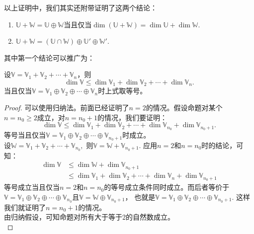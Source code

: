 \documentclass[12pt,UTF8,fontset=none]{ctexbook}
\begin{document}
以上证明中，我们其实还附带证明了这两个结论：
\begin{enumerate}
    \item $\mathbb{U} + \mathbb{W} = \mathbb{U} \oplus \mathbb{W}$当且仅当$\dim (\mathbb{U} + \mathbb{W}) = \dim \mathbb{U} + \dim \mathbb{W}.$
    \item $\mathbb{U} + \mathbb{W} = \left(\mathbb{U} \cap \mathbb{W}\right) \oplus \mathbb{U}' \oplus \mathbb{W}'.$
\end{enumerate}

其中第一个结论可以推广为：
\begin{pp}\label{pp:2_14}
    设$\mathbb{V} = \mathbb{V}_1 + \mathbb{V}_2 + \cdots + \mathbb{V}_n$，则
    $$ \dim \mathbb{V} \leq \dim \mathbb{V}_1 + \dim \mathbb{V}_2 + \cdots + \dim \mathbb{V}_n.$$
    当且仅当$\mathbb{V} = \mathbb{V}_1 \oplus \mathbb{V}_2 \oplus \cdots \oplus \mathbb{V}_n$时上式取等号。\\
\end{pp}

\begin{proof} %
    可以使用归纳法。前面已经证明了$n=2$的情况。假设命题对某个$n = n_0 \geq 2$成立，对$n = n_0+1$的情况，我们要证明：
    $$ \dim \mathbb{V} \leq \dim \mathbb{V}_1 + \dim \mathbb{V}_2 + \cdots + \dim \mathbb{V}_{n_0} + \dim \mathbb{V}_{n_0+1}.$$
    等号当且仅当$\mathbb{V} = \mathbb{V}_1 \oplus \mathbb{V}_2 \oplus \cdots \oplus \mathbb{V}_{n_0+1}$时成立。\\
    设$\mathbb{W} = \mathbb{V}_1 + \mathbb{V}_2 + \cdots + \mathbb{V}_{n_0},$ 则$\mathbb{V} = \mathbb{W} + \mathbb{V}_{n_0+1}.$
    应用$n=2$和$n=n_0$时的结论，可知：\\
    \begin{align*}
         \dim \mathbb{V} &\leq \dim \mathbb{W} + \dim \mathbb{V}_{n_0+1}  \\
               &\leq \dim \mathbb{V}_1 + \dim \mathbb{V}_2 + \cdots + \dim \mathbb{V}_n + \dim \mathbb{V}_{n_0+1} 
    \end{align*}
    等号成立当且仅当$n=2$和$n=n_0$的等号成立条件同时成立。而后者等价于$\mathbb{V} = \mathbb{V}_1 \oplus \mathbb{V}_2 \oplus \cdots \oplus \mathbb{V}_{n_0}$且$\mathbb{V} = \mathbb{W} \oplus \mathbb{V}_{n_0+1}$，
    也就是$\mathbb{V} = \mathbb{V}_1 \oplus \mathbb{V}_2 \oplus \cdots \oplus \mathbb{V}_{n_0+1}.$ 
    这样我们就证明了$n = n_0 + 1$的情况。\\
    由归纳假设，可知命题对所有大于等于2的自然数成立。\\
\end{proof}
\end{document}
